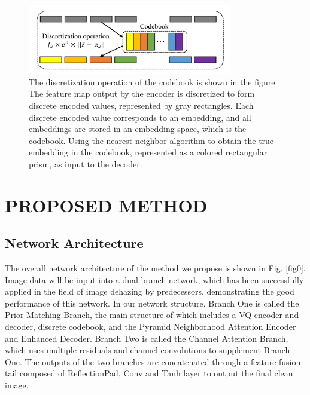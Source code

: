 \documentclass[lettersize,journal]{IEEEtran}
\begin{document}
\begin{figure}[!t]
	\centering
	\includegraphics[width=3.5in]{discretization_operation}
	\caption{The discretization operation of the codebook is shown in the figure. The feature map output by the encoder is discretized to form discrete encoded values, represented by gray rectangles. Each discrete encoded value corresponds to an embedding, and all embeddings are stored in an embedding space, which is the codebook. Using the nearest neighbor algorithm to obtain the true embedding in the codebook, represented as a colored rectangular prism, as input to the decoder.}
	\label{fig2}
\end{figure}

\section{PROPOSED METHOD}
\subsection{Network Architecture}
The overall network architecture of the method we propose is shown in Fig. \ref{fig0}. Image data will be input into a dual-branch network, which has been successfully applied in the field of image dehazing by predecessors, demonstrating the good performance of this network. In our network structure, Branch One is called the Prior Matching Branch, the main structure of which includes a VQ encoder and decoder, discrete codebook, and the Pyramid Neighborhood Attention Encoder and Enhanced Decoder. Branch Two is called the Channel Attention Branch, which uses multiple residuals and channel convolutions to supplement Branch One. The outputs of the two branches are concatenated through a feature fusion tail composed of ReflectionPad, Conv and Tanh layer to output the final clean image.
\end{document}
